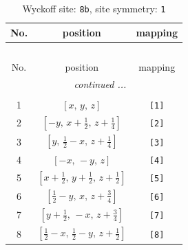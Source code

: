 \documentclass[fleqn,8pt]{jsarticle}
\begin{document}
\begin{longtable}{ccc}
\caption{Wyckoff site: {\tt 8b}, site symmetry: {\tt 1}}
 \\
 \hline \hline
No. & position & mapping \\ \hline \endfirsthead

\multicolumn{2}{l}{\tablename\ \thetable{}} \\
 \hline \hline
No. & position & mapping \\ \hline \endhead

 \hline \hline
\multicolumn{2}{r}{\footnotesize\it continued ...} \\ \endfoot

 \hline \hline
\multicolumn{2}{r}{} \\ \endlastfoot

1 & $\left[ x,\, y,\, z \right]$ & {\tt [1]} \\ \hline
2 & $\left[ - y,\, x + \frac{1}{2},\, z + \frac{1}{4} \right]$ & {\tt [2]} \\ \hline
3 & $\left[ y,\, \frac{1}{2} - x,\, z + \frac{1}{4} \right]$ & {\tt [3]} \\ \hline
4 & $\left[ - x,\, - y,\, z \right]$ & {\tt [4]} \\ \hline
5 & $\left[ x + \frac{1}{2},\, y + \frac{1}{2},\, z + \frac{1}{2} \right]$ & {\tt [5]} \\ \hline
6 & $\left[ \frac{1}{2} - y,\, x,\, z + \frac{3}{4} \right]$ & {\tt [6]} \\ \hline
7 & $\left[ y + \frac{1}{2},\, - x,\, z + \frac{3}{4} \right]$ & {\tt [7]} \\ \hline
8 & $\left[ \frac{1}{2} - x,\, \frac{1}{2} - y,\, z + \frac{1}{2} \right]$ & {\tt [8]} \\
\end{longtable}
\end{document}
